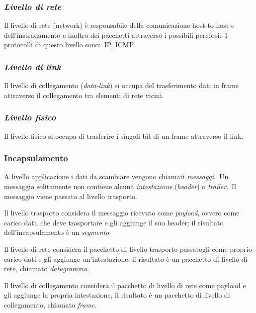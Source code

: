 \subsubsection{\emph{Livello di rete}}

Il livello di rete (network) è responsabile della comunicazione host-to-host e dell'instradamento e inoltro dei pacchetti attraverso i possibili percorsi.\
I protocolli di questo livello sono:\ IP, ICMP.

\subsubsection{\emph{Livello di link}}

Il livello di collegamento (\emph{data-link}) si occupa del trasferimento dati in frame attraverso il collegamento tra elementi di rete vicini.

\subsubsection{\emph{Livello fisico}}

Il livello fisico si occupa di trasferire i singoli bit di un frame attraverso il link.

\subsubsection{Incapsulamento}

A livello applicazione i dati da scambiare vengono chiamati \emph{messaggi}.\
Un messaggio solitamente non contiene alcuna \emph{intestazione} (\emph{header}) o \emph{trailer}.\
Il messaggio viene passato al livello trasporto.

Il livello trasporto considera il messaggio ricevuto come \emph{payload}, ovvero come carico dati, che deve trasportare e gli aggiunge il suo header; il risultato dell'incapsulamento è un \emph{segmento}.

Il livello di rete considera il pacchetto di livello trasporto passatogli come proprio carico dati e gli aggiunge un'intestazione, il risultato è un pacchetto di livello di rete, chiamato \emph{datagramma}.

Il livello di collegamento considera il pacchetto di livello di rete come payload e gli aggiunge la propria intestazione, il risultato è un pacchetto di livello di collegamento, chiamato \emph{frame}.

